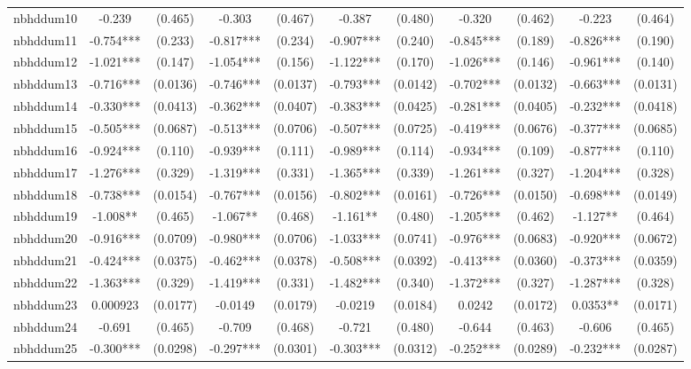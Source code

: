 \documentclass[]{article}
\begin{document}
\begin{tabular}{lcccccccccc}
nbhddum10 & -0.239 & (0.465) & -0.303 & (0.467) & -0.387 & (0.480) & -0.320 & (0.462) & -0.223 & (0.464) \\
nbhddum11 & -0.754*** & (0.233) & -0.817*** & (0.234) & -0.907*** & (0.240) & -0.845*** & (0.189) & -0.826*** & (0.190) \\
nbhddum12 & -1.021*** & (0.147) & -1.054*** & (0.156) & -1.122*** & (0.170) & -1.026*** & (0.146) & -0.961*** & (0.140) \\
nbhddum13 & -0.716*** & (0.0136) & -0.746*** & (0.0137) & -0.793*** & (0.0142) & -0.702*** & (0.0132) & -0.663*** & (0.0131) \\
nbhddum14 & -0.330*** & (0.0413) & -0.362*** & (0.0407) & -0.383*** & (0.0425) & -0.281*** & (0.0405) & -0.232*** & (0.0418) \\
nbhddum15 & -0.505*** & (0.0687) & -0.513*** & (0.0706) & -0.507*** & (0.0725) & -0.419*** & (0.0676) & -0.377*** & (0.0685) \\
nbhddum16 & -0.924*** & (0.110) & -0.939*** & (0.111) & -0.989*** & (0.114) & -0.934*** & (0.109) & -0.877*** & (0.110) \\
nbhddum17 & -1.276*** & (0.329) & -1.319*** & (0.331) & -1.365*** & (0.339) & -1.261*** & (0.327) & -1.204*** & (0.328) \\
nbhddum18 & -0.738*** & (0.0154) & -0.767*** & (0.0156) & -0.802*** & (0.0161) & -0.726*** & (0.0150) & -0.698*** & (0.0149) \\
nbhddum19 & -1.008** & (0.465) & -1.067** & (0.468) & -1.161** & (0.480) & -1.205*** & (0.462) & -1.127** & (0.464) \\
nbhddum20 & -0.916*** & (0.0709) & -0.980*** & (0.0706) & -1.033*** & (0.0741) & -0.976*** & (0.0683) & -0.920*** & (0.0672) \\
nbhddum21 & -0.424*** & (0.0375) & -0.462*** & (0.0378) & -0.508*** & (0.0392) & -0.413*** & (0.0360) & -0.373*** & (0.0359) \\
nbhddum22 & -1.363*** & (0.329) & -1.419*** & (0.331) & -1.482*** & (0.340) & -1.372*** & (0.327) & -1.287*** & (0.328) \\
nbhddum23 & 0.000923 & (0.0177) & -0.0149 & (0.0179) & -0.0219 & (0.0184) & 0.0242 & (0.0172) & 0.0353** & (0.0171) \\
nbhddum24 & -0.691 & (0.465) & -0.709 & (0.468) & -0.721 & (0.480) & -0.644 & (0.463) & -0.606 & (0.465) \\
nbhddum25 & -0.300*** & (0.0298) & -0.297*** & (0.0301) & -0.303*** & (0.0312) & -0.252*** & (0.0289) & -0.232*** & (0.0287) \\

\end{tabular}
\end{document}
